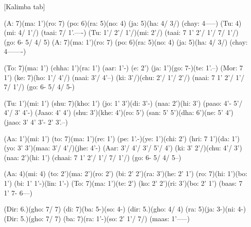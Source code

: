 \documentclass[11pt]{article}
\begin{document}
[Kalimba tab]
\begin{jianpu}
(A: 7)(ma: 1')(ro: 7) (po: 6)(ra: 5)(no: 4) (ja: 5)(ha: 4/ 3/) (chay: 4-----)
(Tu: 4)(mi: 4/ 1'/) (taai: 7/ 1'.----)
(Tu: 1'/ 2'/ 1'/)(mi: 2'/) (taai: 7 1' 2'/ 1'/ 7/ 1'/) (go: 6- 5/ 4/ 5)
(A: 7)(ma: 1')(ro: 7) (po: 6)(ra: 5)(no: 4) (ja: 5)(ha: 4/ 3/) (chay: 4-------)

(To: 7)(ma: 1') (chha: 1')(ra: 1') (aar: 1'-) (e: 2') (ja: 1')(go: 7-)(te: 1'.--)
(Mor: 7 1') (ke: 7)(ho: 1'/ 4'/) (naai: 3'/ 4'--)
(ki: 3'/)(chu: 2'/ 1'/ 2'/) (naai: 7 1' 2'/ 1'/ 7/ 1'/) (go: 6- 5/ 4/ 5-)

(Tu: 1')(mi: 1') (shu: 7)(kho: 1') (jo: 1' 3')(di: 3'-) (naa: 2')(hi: 3') (paao: 4'- 5'/ 4'/ 3' 4'-)
(Jaao: 4' 4') (shu: 3')(khe: 4')(ro: 5') (san: 5' 5')(dha: 6')(ne: 5' 4') (jaao: 3' 4' 3'- 2' 3'.--)

(Aa: 1')(mi: 1') (to: 7)(ma: 1')(re: 1') (pe: 1'.-)(ye: 1')(chi: 2')
(hri: 7 1')(da: 1')(yo: 3' 3')(maa: 3'/ 4'/)(jhe: 4'-)
(Aar: 3'/ 4'/ 3'/ 5'/ 4') (ki: 3' 2'/)(chu: 4'/ 3')
(naa: 2')(hi: 1') (chaai: 7 1' 2'/ 1'/ 7/ 1'/) (go: 6- 5/ 4/ 5--)

(Aa: 4)(mi: 4) (to: 2')(ma: 2')(ro: 2') (bi: 2' 2')(ra: 3')(he: 2' 1')
(ro: 7)(hi: 1')(bo: 1') (bi: 1' 1'-)(lin: 1'-)
(To: 7)(ma: 1')(te: 2') (ko: 2' 2')(ri: 3')(bo: 2' 1') (baas: 7 1' 7- 6---)

(Dir: 6.)(gho: 7/ 7) (di: 7)(ba: 5-)(so: 4-) (dir: 5.)(gho: 4/ 4) (ra: 5)(ja: 3-)(ni: 4-)
(Dir: 5.)(gho: 7/ 7) (ba: 7)(ra: 1'-)(so: 2' 1'/ 7/) (maas: 1'-----)
\end{jianpu}
\end{document}
